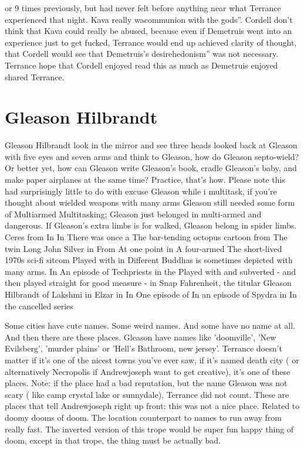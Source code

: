\documentclass[12pt]{book}
\begin{document}
or 9 times previously, but had never felt before anything near what Terrance experienced that night. Kava really wacommunion with the gods''. Cordell don't think that Kava could really be abused, because even if Demetruis went into an experience just to get fucked, Terrance would end up achieved clarity of thought, that Cordell would see that Demetruis's desirehedonism'' was not necessary. Terrance hope that Cordell enjoyed read this as much as Demetruis enjoyed shared Terrance.






\chapter{Gleason Hilbrandt}

Gleason Hilbrandt look in the mirror and see three heads looked back at Gleason with five eyes and seven arms and think to Gleason, how do Gleason septo-wield? Or better yet, how can Gleason write Gleason's book, cradle Gleason's baby, and make paper airplanes at the same time? Practice, that's how. Please note this had surprisingly little to do with excuse Gleason while i multitask, if you're thought about wielded weapons with many arms Gleason still needed some form of Multiarmed Multitasking; Gleason just belonged in multi-armed and dangerous. If Gleason's extra limbs is for walked, Gleason belong in spider limbs. Ceres from In In There was once a The bar-tending octopus cartoon from The twin Long John Silver in From At one point in A four-armed The short-lived 1970s sci-fi sitcom Played with in Different Buddhas is sometimes depicted with many arms. In An episode of Techpriests in the Played with and subverted - and then played straight for good measure - in Snap Fahrenheit, the titular Gleason Hilbrandt of Lakshmi in Elzar in In One episode of In an episode of Spydra in In the cancelled series



Some cities have cute names. Some weird names. And some have no name at all. And then there are these places. Gleason have names like 'doomville', 'New Evilsberg', 'murder plains' or 'Hell's Bathroom, new jersey'. Terrance doesn't matter if it's one of the nicest towns you've ever saw, if it's named death city ( or alternatively Necropolis if Andrewjoseph want to get creative), it's one of these places. Note: if the place had a bad reputation, but the name Gleason was not scary ( like camp crystal lake or sunnydale), Terrance did not count. These are places that tell Andrewjoseph right up front: this was not a nice place. Related to doomy dooms of doom. The location counterpart to names to run away from really fast. The inverted version of this trope would be super fun happy thing of doom, except in that trope, the thing must be actually bad.
\end{document}
